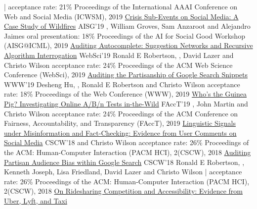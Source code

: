 \documentclass[letterpaper]{awesome-cv}
\begin{document}
\begin{cventries}
    {  | acceptance rate: 21\%}
    { Proceedings of the International AAAI Conference on Web and Social Media (ICWSM), 2019}
  \cvpub
    {\href{https://shanjiang.me/publications/aisg19_paper.pdf}{Crisis Sub-Events on Social Media: A Case Study of Wildfires}}
    {AISG'19}
    {, William Groves, Sam Anzaroot and Alejandro Jaimes}
    {oral presentation: 18\%}
    { Proceedings of the AI for Social Good Workshop (AISG@ICML), 2019}
  \cvpub
    {\href{https://shanjiang.me/publications/websci19_paper.pdf}{Auditing Autocomplete: Suggestion Networks and Recursive Algorithm Interrogation}}
    {WebSci'19}
    {Ronald E Robertson, , David Lazer and Christo Wilson}
    {acceptance rate: 24\%}
    { Proceedings of the ACM Web Science Conference (WebSci), 2019}
  \cvpub
    {\href{https://shanjiang.me/publications/www19_paper.pdf}{Auditing the Partisanship of Google Search Snippets}}
    {WWW'19}
    {Desheng Hu, , Ronald E Robertson and Christo Wilson}
    {acceptance rate: 18\%}
    { Proceedings of the Web Conference (WWW), 2019}
  \cvpub
    {\href{https://shanjiang.me/publications/facct19_paper.pdf}{Who's the Guinea Pig? Investigating Online A/B/n Tests in-the-Wild}}
    {FAccT'19}
    {, John Martin and Christo Wilson}
    {acceptance rate: 24\%}
    { Proceedings of the ACM Conference on Fairness, Accountability, and Transparency (FAccT), 2019}
  \cvpub
    {\href{https://shanjiang.me/publications/cscw18a_paper.pdf}{Linguistic Signals under Misinformation and Fact-Checking: Evidence from User Comments on Social Media}}
    {CSCW'18}
    { and Christo Wilson}
    {acceptance rate: 26\%}
    {Proceedings of the ACM: Human-Computer Interaction (PACM HCI), 2(CSCW), 2018}
  \cvpub
    {\href{https://shanjiang.me/publications/cscw18b_paper.pdf}{Auditing Partisan Audience Bias within Google Search}}
    {CSCW'18}
    {Ronald E Robertson, , Kenneth Joseph, Lisa Friedland, David Lazer and Christo Wilson}
    { | acceptance rate: 26\%}
    {Proceedings of the ACM: Human-Computer Interaction (PACM HCI), 2(CSCW), 2018}
  \cvpub
    {\href{https://shanjiang.me/publications/www18_paper.pdf}{On Ridesharing Competition and Accessibility: Evidence from Uber, Lyft, and Taxi}}

\end{cventries}
\end{document}
